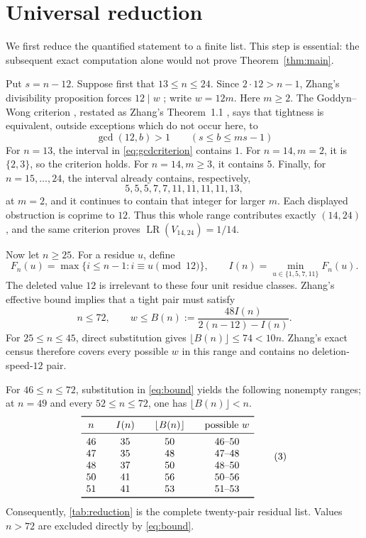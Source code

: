 \documentclass[11pt]{article}
\newcommand{\LR}{\operatorname{LR}}
\begin{document}
\section{Universal reduction}

We first reduce the quantified statement to a finite list.  This step is
essential: the subsequent exact computation alone would not prove
Theorem~\ref{thm:main}.

Put \(s=n-12\).  Suppose first that \(13\leq n\leq24\).  Since
\(2\cdot12>n-1\), Zhang's divisibility proposition forces \(12\mid w\)
\cite[Proposition~1.3]{Zhang2026}; write \(w=12m\).  Here \(m\geq2\).
The Goddyn--Wong criterion \cite[Theorem~2.3]{GoddynWong2006}, restated as
Zhang's Theorem~1.1 \cite{Zhang2026}, says that tightness is equivalent,
outside exceptions which do not occur here, to
\[
 \gcd(12,b)>1\qquad(s\leq b\leq ms-1)
 \tag{1}\label{eq:gcdcriterion}
\]
For \(n=13\), the interval in \eqref{eq:gcdcriterion} contains \(1\).
For \(n=14,m=2\), it is \(\{2,3\}\), so the criterion holds.  For
\(n=14,m\geq3\), it contains \(5\).  Finally, for
\(n=15,\ldots,24\), the interval already contains, respectively,
\[
 5,5,5,7,7,11,11,11,11,13,
\]
at \(m=2\), and it continues to contain that integer for larger \(m\).
Each displayed obstruction is coprime to \(12\).  Thus this whole range
contributes exactly \((14,24)\), and the same criterion proves
\(\LR(V_{14,24})=1/14\).

Now let \(n\geq25\).  For a residue \(u\), define
\[
 F_n(u)=\max\{i\leq n-1:i\equiv u\pmod {12}\},\qquad
 I(n)=\min_{u\in\{1,5,7,11\}}F_n(u).
\]
The deleted value \(12\) is irrelevant to these four unit residue classes.
Zhang's effective bound \cite[Theorem~1.6]{Zhang2026} implies that a tight
pair must satisfy
\[
 n\leq72,
 \qquad
 w\leq B(n):=\frac{48I(n)}{2(n-12)-I(n)}.
 \tag{2}\label{eq:bound}
\]
For \(25\leq n\leq45\), direct substitution gives
\(\lfloor B(n)\rfloor\leq74<10n\).  Zhang's exact census
\cite[Theorem~1.8(i) and Table~1]{Zhang2026} therefore covers every possible
\(w\) in this range and contains no deletion-speed-\(12\) pair.

For \(46\leq n\leq72\), substitution in \eqref{eq:bound} yields the
following nonempty ranges; at \(n=49\) and every \(52\leq n\leq72\), one
has \(\lfloor B(n)\rfloor<n\).
\[
\begin{array}{c@{\qquad}c@{\qquad}c@{\qquad}c}
\toprule
n&I(n)&\lfloor B(n)\rfloor&\text{possible }w\\
\midrule
46&35&50&46\text{--}50\\
47&35&48&47\text{--}48\\
48&37&50&48\text{--}50\\
50&41&56&50\text{--}56\\
51&41&53&51\text{--}53\\
\bottomrule
\end{array}
\tag{3}\label{tab:reduction}
\]
Consequently, \eqref{tab:reduction} is the complete twenty-pair residual list.  Values
\(n>72\) are excluded directly by \eqref{eq:bound}.
\end{document}
